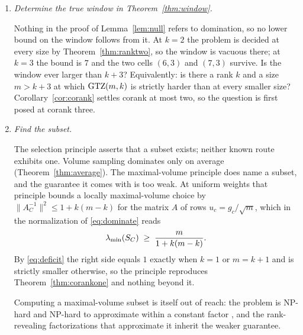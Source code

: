 \begin{enumerate}
Is that list complete at $(6,3)$ and $(7,3)$?  Is it finite, as a list of
families?  Does every extremal design have every basis active, that is
$\lmin(\SC)=1$ for every independent $k$-subset $C$?
Every known extremal design does: at the tetrahedron all four
triples are bases and all are active, and at the diamond the eight spanning
trees are bases and all eight have positive semidefinite singular gaps, the two
circuits being dependent and carrying no volume-sampling mass.  An affirmative
answer gives the hypothesis under which Proposition~\ref{prop:qone}
yields $q(1)=0$, and so is what Problem~\ref{prob:interlace} would have to
face at the equality locus.

\item\label{prob:higher}
\emph{Determine the true window in Theorem~\ref{thm:window}.}

Nothing in the proof of Lemma~\ref{lem:null}
refers to domination, so no lower bound on the window follows from it.  At
$k=2$ the
problem is decided at every size by Theorem~\ref{thm:ranktwo}, so the window is
vacuous there; at $k=3$ the bound is $7$ and the two cells $(6,3)$ and $(7,3)$
survive.  Is the window ever larger than $k+3$?  Equivalently: is there a rank
$k$ and a size $m>k+3$ at which $\mathrm{GTZ}(m,k)$ is strictly harder than at every
smaller size?  Corollary~\ref{cor:corank} settles corank at most two, so the
question is first posed at corank three.

\item\label{prob:effective}
\emph{Find the subset.}

The selection principle asserts that a subset exists; neither known route
exhibits one.  Volume sampling dominates only on average
(Theorem~\ref{thm:average}).  The maximal-volume principle
\cite{GT2001} does name a subset, and the guarantee it comes with is too
weak.  At uniform
weights that principle bounds a locally maximal-volume choice by
$\lVert A_C^{-1}\rVert^2\le1+k(m-k)$ for the matrix $A$ of rows $u_c=g_c/\sqrt m$,
which in the normalization of \eqref{eq:dominate} reads
\[
  \lambda_{\min}(S_{C})\;\ge\;\frac{m}{1+k(m-k)} .
\]
By \eqref{eq:deficit} the right side equals $1$ exactly when $k=1$ or $m=k+1$
and is strictly smaller otherwise, so the principle reproduces
Theorem~\ref{thm:corankone} and nothing beyond it.

Computing a maximal-volume subset is itself out of reach: the problem is
NP-hard and NP-hard to approximate within a constant factor
\cite{CivrilMagdonIsmail2009}, and the rank-revealing factorizations that
approximate it \cite{GuEisenstat1996} inherit the weaker guarantee.


\end{enumerate}
